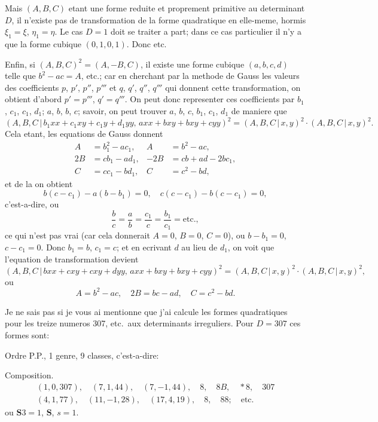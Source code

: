 \documentclass[11pt,a4paper]{book}
\begin{document}
Mais $(A,B,C)$ etant une forme reduite et proprement primitive au determinant $D$, il n'existe pas de transformation de la forme quadratique en elle-meme, hormis $\xi_1 = \xi$, $\eta_1 = \eta$. Le cas $D=1$ doit se traiter a part; dans ce cas particulier il n'y a que la forme cubique $(0,1,0,1)$. Donc etc.

Enfin, si $(A,B,C)^2 = (A,-B,C)$, il existe une forme cubique $(a,b,c,d)$ telle que $b^2-ac = A$, etc.; car en cherchant par la methode de Gauss les valeurs des coefficients $p$, $p'$, $p''$, $p'''$ et $q$, $q'$, $q''$, $q'''$ qui donnent cette transformation, on obtient d'abord $p'=p'''$, $q'=q'''$. On peut donc representer ces coefficients par $b_1$, $c_1$, $c_1$, $d_1$; $a$, $b$, $b$, $c$; savoir, on peut trouver $a$, $b$, $c$, $b_1$, $c_1$, $d_1$ de maniere que
\[
(A,B,C \,|\, b_1 xx + c_1 xy + c_1 y + d_1 yy, \, axx + bxy + bxy + cyy)^2 = (A,B,C \,|\, x,y)^2 \cdot (A,B,C \,|\, x,y)^2.
\]
Cela etant, les equations de Gauss donnent
\begin{align*}
A &= b_1^2 - ac_1, & A &= b^2 - ac, \\
2B &= cb_1 - ad_1, & -2B &= cb + ad - 2bc_1, \\
C &= cc_1 - bd_1, & C &= c^2 - bd,
\end{align*}
et de la on obtient
\[
b(c-c_1) - a(b-b_1) = 0, \quad c(c-c_1) - b(c-c_1) = 0,
\]
c'est-a-dire, ou
\[
\frac{b}{c} = \frac{a}{b} = \frac{c_1}{c} = \frac{b_1}{c_1} = \text{etc.},
\]
ce qui n'est pas vrai (car cela donnerait $A=0$, $B=0$, $C=0$), ou $b-b_1=0$, $c-c_1=0$. Donc $b_1=b$, $c_1=c$; et en ecrivant $d$ au lieu de $d_1$, on voit que l'equation de transformation devient
\[
(A,B,C \,|\, bxx + cxy + cxy + dyy, \, axx + bxy + bxy + cyy)^2 = (A,B,C \,|\, x,y)^2 \cdot (A,B,C \,|\, x,y)^2,
\]
ou
\[
A = b^2 - ac, \quad 2B = bc - ad, \quad C = c^2 - bd.
\]

Je ne sais pas si je vous ai mentionne que j'ai calcule les formes quadratiques pour les treize numeros 307, etc.\ aux determinants irreguliers. Pour $D = 307$ ces formes sont:

Ordre P.P., 1 genre, 9 classes, c'est-a-dire:

Composition.
\begin{gather*}
(1,0,307), \quad (7,1,44), \quad (7,-1,44), \quad 8, \quad 8B, \quad *8, \quad 307 \\
(4,1,77), \quad (11,-1,28), \quad (17,4,19), \quad 8, \quad 88; \quad \text{etc.}
\end{gather*}
ou $\mathbf{S}3 = 1$, $\mathbf{S}$, $s = 1$.
\end{document}
